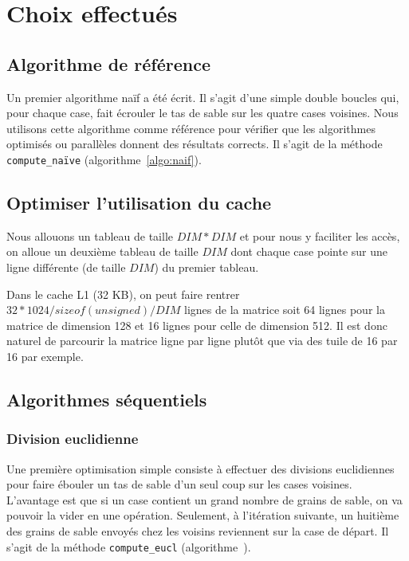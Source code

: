 \section {Choix effectués}

\subsection{Algorithme de référence}

Un premier algorithme naïf a été écrit. Il s'agit d'une simple double
boucles qui, pour chaque case, fait écrouler le tas de sable sur les
quatre cases voisines.  Nous utilisons cette algorithme comme
référence pour vérifier que les algorithmes optimisés ou parallèles
donnent des résultats corrects. Il s'agit de la méthode
\texttt{compute\_naïve} (algorithme~\ref{algo:naif}).
\medskip

\subsection{Optimiser l'utilisation du cache}
\label{sec:cache}

Nous allouons un tableau de taille $DIM*DIM$ et pour nous y faciliter les
accès, on alloue un deuxième tableau de taille $DIM$ dont chaque case
pointe sur une ligne différente (de taille $DIM$) du premier tableau.

Dans le cache L1 (32 KB), on peut faire rentrer
$32*1024/sizeof(unsigned)/DIM$ lignes de la matrice soit 64 lignes
pour la matrice de dimension 128 et 16 lignes pour celle de dimension
512. Il est donc naturel de parcourir la matrice ligne par ligne
plutôt que via des tuile de 16 par 16 par exemple.

\subsection{Algorithmes séquentiels}

\subsubsection{Division euclidienne}

Une première optimisation simple consiste à effectuer des divisions
euclidiennes pour faire ébouler un tas de sable d'un seul coup sur les
cases voisines. L'avantage est que si un case contient un grand nombre
de grains de sable, on va pouvoir la vider en une
opération. Seulement, à l'itération suivante, un huitième des grains
de sable envoyés chez les voisins reviennent sur la case de départ.
Il s'agit de la méthode \texttt{compute\_eucl} (algorithme~).
\medskip

